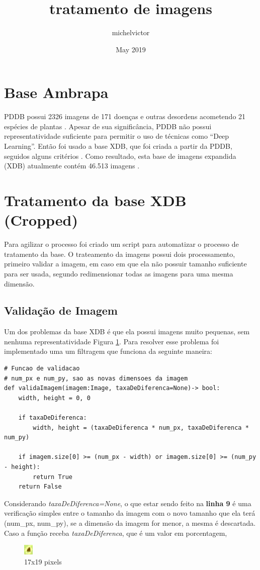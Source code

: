 \documentclass{article}
\title{tratamento de imagens}
\author{michelvictor }
\date{May 2019}
\begin{document}
\maketitle

\section{Base Ambrapa}
 PDDB possui 2326 imagens de 171 doenças e outras desordens acometendo 21 espécies de plantas \citep{Embrapa}. Apesar de sua significância, PDDB não possui representatividade suficiente para permitir o uso de técnicas como “Deep  Learning”.
 Então foi usado a base XDB, que foi criada a partir da PDDB, seguidos alguns critérios \citep{Embrapa}.   Como  resultado,  esta base de imagens expandida (XDB) atualmente contém 46.513 imagens \citep{Embrapa}.
 
 \cite{github}

\section{Tratamento da base XDB (Cropped)}
Para agilizar o processo foi criado um script para automatizar o processo de tratamento da base. O trateamento da imagens possui dois processamento, primeiro validar a imagem, em caso em que ela não possuir tamanho suficiente para ser usada, segundo redimensionar todas as imagens para uma mesma dimensão.

\subsection{Validação de Imagem}
Um dos problemas da base XDB é que ela possui imagens muito pequenas, sem nenhuma representatividade Figura \ref{fig:ferr001}. Para resolver esse problema foi implementado uma um filtragem que funciona da seguinte maneira:

\begin{lstlisting}
# Funcao de validacao
# num_px e num_py, sao as novas dimensoes da imagem
def validaImagem(imagem:Image, taxaDeDiferenca=None)-> bool:
    width, height = 0, 0

    if taxaDeDiferenca:
        width, height = (taxaDeDiferenca * num_px, taxaDeDiferenca * num_py)

    if imagem.size[0] >= (num_px - width) or imagem.size[0] >= (num_py - height):
        return True
    return False
\end{lstlisting}
Considerando \textit{taxaDeDiferenca=None}, o que estar sendo feito na \textbf{linha 9} é uma verificação simples entre o tamanho da imagem com o novo tamanho que ela terá (num\_px, num\_py), se a dimensão da imagem for menor, a mesma é descartada. Caso a função receba \textit{taxaDeDiferenca}, que é um valor em porcentagem, 
\begin{figure}[ht!]
\centering
\includegraphics[scale=1]{img/ferr001.jpg}
\caption{17x19 pixels}
\label{fig:ferr001}
\end{figure}
\end{document}
